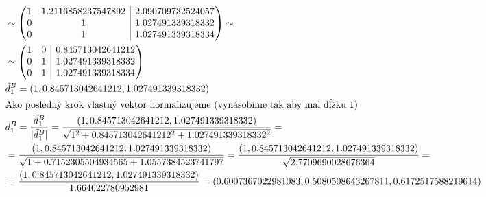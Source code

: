 \documentclass[a4paper]{article}
\begin{document}
\begin{align*}
		\\
		&\sim\left( \mkern1mu
		\begin{array}{@{}cc|c@{}}
			1 & 1.2116858237547892 & 2.090709732524057\\
			0 & 1 & 1.027491339318332\\
			0 & 1 & 1.027491339318334
		\end{array} \mkern1mu \right)\sim
		\\
		&\sim\left( \mkern1mu
		\begin{array}{@{}cc|c@{}}
			1 & 0 & 0.845713042641212\\
			0 & 1 & 1.027491339318332\\
			0 & 1 & 1.027491339318334
		\end{array} \mkern1mu \right)
		\\
		&\tilde{d}_1^B=(1, 0.845713042641212, 1.027491339318332)
		\\
		&\text{Ako posledný krok vlastný vektor normalizujeme (vynásobíme tak aby mal dĺžku 1)}
		\\
		&d_1^B=\frac{\tilde{d}_1^B}{|\tilde{d}_1^B|}=
		\frac{(1, 0.845713042641212, 1.027491339318332)}{\sqrt{1^2 + 0.845713042641212^2 + 1.027491339318332^2}}=
		\\
		&=\frac{(1, 0.845713042641212, 1.027491339318332)}{\sqrt{1 + 0.7152305504934565 + 1.0557384523741797}}
		=\frac{(1, 0.845713042641212, 1.027491339318332)}{\sqrt{2.7709690028676364}}=
		\\
		&=\frac{(1, 0.845713042641212, 1.027491339318332)}{1.664622780952981}
		=(0.6007367022981083, 0.5080508643267811, 0.6172517588219614)
	\end{align*}
\end{document}
